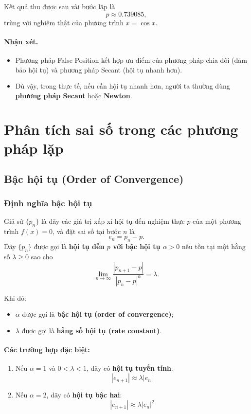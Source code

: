 Kết quả thu được sau vài bước lặp là 
\[
    p \approx 0.739085,
\]
trùng với nghiệm thật của phương trình $x = \cos x$.

\paragraph*{Nhận xét.}
\begin{itemize}
    \item Phương pháp False Position kết hợp ưu điểm của phương pháp chia đôi (đảm bảo hội tụ) và phương pháp Secant (hội tụ nhanh hơn).
    \item Dù vậy, trong thực tế, nếu cần hội tụ nhanh hơn, người ta thường dùng \textbf{phương pháp Secant} hoặc \textbf{Newton}.
\end{itemize}

\section{Phân tích sai số trong các phương pháp lặp}

\subsection{Bậc hội tụ (Order of Convergence)}
\subsubsection*{Định nghĩa bậc hội tụ}

Giả sử $\{p_n\}$ là dãy các giá trị xấp xỉ hội tụ đến nghiệm thực $p$ của một phương trình $f(x) = 0$, và đặt sai số tại bước $n$ là 
\[
e_n = p_n - p.
\]
Dãy $\{p_n\}$ được gọi là \textbf{hội tụ đến $p$ với bậc hội tụ $\alpha > 0$} nếu tồn tại một hằng số $\lambda \ge 0$ sao cho
\[
    \lim_{n \to \infty} 
    \frac{|p_{n+1} - p|}{|p_n - p|^{\alpha}} = \lambda.
\]

Khi đó:
\begin{itemize}
    \item $\alpha$ được gọi là \textbf{bậc hội tụ (order of convergence)};
    \item $\lambda$ được gọi là \textbf{hằng số hội tụ (rate constant)}.
\end{itemize}

\paragraph*{Các trường hợp đặc biệt:}
\begin{enumerate}
    \item Nếu $\alpha = 1$ và $0 < \lambda < 1$, dãy có \textbf{hội tụ tuyến tính}:
    \[
        |e_{n+1}| \approx \lambda |e_n|
    \]
    \item Nếu $\alpha = 2$, dãy có \textbf{hội tụ bậc hai}:
    \[
        |e_{n+1}| \approx \lambda |e_n|^2
    \]

\end{enumerate}

